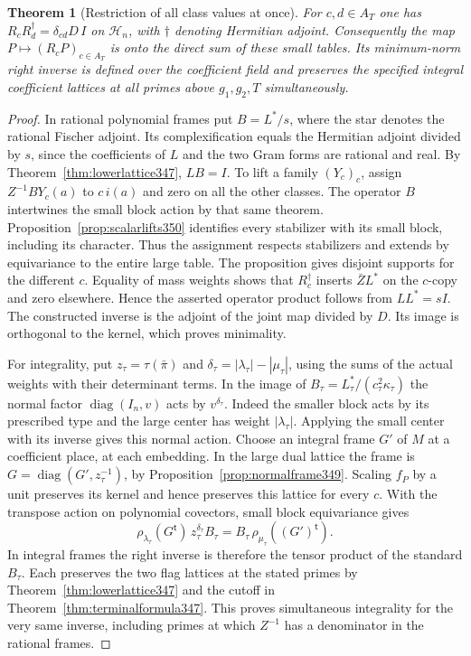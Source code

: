 \documentclass[a4paper,11pt]{article}
\newtheorem{theorem}[proposition]{Theorem}
\theoremstyle{definition}
\theoremstyle{remark}
\numberwithin{equation}{section}
\begin{document}
\begin{theorem}[Restriction of all class values at once]\leavevmode
\label{thm:allclasses350}
For \(c,d\in A_T\) one has \(R_cR_d^\dagger=\delta_{cd}D\,I\)
on \(\mathcal H_n\), with \(\dagger\) denoting Hermitian adjoint.
Consequently the map \(P\mapsto(R_cP)_{c\in A_T}\) is onto the
direct sum of these small tables. Its minimum-norm right inverse
is defined over the coefficient field and preserves the specified
integral coefficient lattices at all primes above \(g_1,g_2,T\)
simultaneously.
\end{theorem}
\begin{proof}
In rational polynomial frames put \(B=L^*/s\), where the star
denotes the rational Fischer adjoint. Its complexification equals
the Hermitian adjoint divided by \(s\), since the coefficients
of \(L\) and the two Gram forms are rational and real. By
Theorem~\ref{thm:lowerlattice347}, \(LB=I\). To lift a family
\((Y_c)_c\), assign \(Z^{-1}B Y_c(a)\) to \(c\,i(a)\) and zero
on all the other classes. The operator \(B\) intertwines the
small block action by that same theorem. Proposition~\ref{prop:scalarlifts350}
identifies every stabilizer with its small block, including its
character. Thus the assignment respects stabilizers and extends
by equivariance to the entire large table. The proposition gives
disjoint supports for the different \(c\). Equality of mass
weights shows that \(R_c^\dagger\) inserts \(\bar ZL^*\) on the
\(c\)-copy and zero elsewhere. Hence the asserted operator product
follows from \(LL^*=sI\). The constructed inverse is the adjoint
of the joint map divided by \(D\). Its image is orthogonal to the
kernel, which proves minimality.

For integrality, put \(z_\tau=\tau(\bar\pi)\) and
\(\delta_\tau=|\lambda_\tau|-|\mu_\tau|\), using the sums of the
actual weights with their determinant terms. In the image of
\(B_\tau=L_\tau^*/(c_\tau^2\kappa_\tau)\) the normal factor
\(\operatorname{diag}(I_n,v)\) acts by \(v^{\delta_\tau}\).
Indeed the smaller block acts by its prescribed type and the
large center has weight \(|\lambda_\tau|\). Applying the small
center with its inverse gives this normal action.
Choose an integral frame \(G'\) of \(M\) at a coefficient place,
at each embedding. In the large dual lattice the frame is
\(G=\operatorname{diag}(G',z_\tau^{-1})\), by
Proposition~\ref{prop:normalframe349}. Scaling \(f_P\) by a unit
preserves its kernel and hence preserves this lattice for every
\(c\). With the transpose action on polynomial covectors, small
block equivariance gives
\[
 \rho_{\lambda_\tau}(G^{\mathsf t})\,z_\tau^{\delta_\tau}B_\tau
       = B_\tau\,\rho_{\mu_\tau}((G')^{\mathsf t}).
\]
In integral frames the right inverse is therefore the tensor
product of the standard \(B_\tau\). Each preserves the two flag
lattices at the stated primes by Theorem~\ref{thm:lowerlattice347}
and the cutoff in Theorem~\ref{thm:terminalformula347}. This
proves simultaneous integrality for the very same inverse,
including primes at which \(Z^{-1}\) has a denominator in the
rational frames.
\end{proof}
\end{document}
